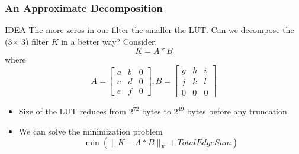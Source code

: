 \documentclass{beamer}
\begin{document}
\begin{frame}
\frametitle{An Approximate Decomposition}
\begin{beamerboxesrounded}[lower=eeks2,upper=eecks,
shadow=true]{IDEA}
The more zeros in our filter the smaller the LUT. Can we decompose the (3$\times$ 3) filter $K$ in a better way? Consider:
$$
K=A*B
$$
where
$$A=
\begin{bmatrix}
a & b & 0\\
c & d & 0\\
e & f & 0
\end{bmatrix}
,
B=
\begin{bmatrix}
g & h & i\\
j & k & l\\
0 & 0 & 0
\end{bmatrix}
$$
\end{beamerboxesrounded}

\begin{itemize}
\item
Size of the LUT reduces from $2^{72}$ bytes to $2^{49}$ bytes before any truncation.
\item
We can solve the minimization problem
$$
\min (\|K-A*B\|_F + Total Edge Sum)
$$
\end{itemize}
\end{frame}
\end{document}
